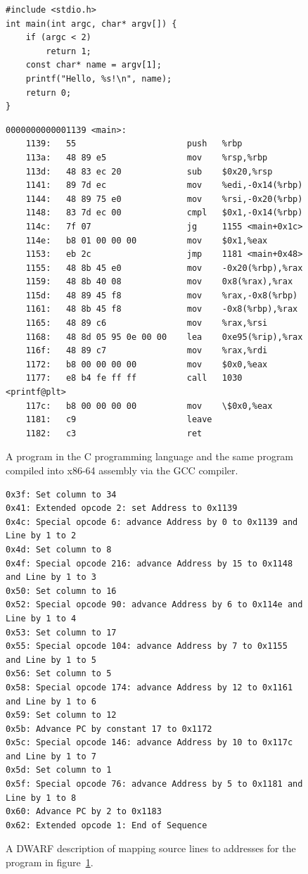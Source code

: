 \begin{figure}
    \begin{verbatim}
#include <stdio.h>
int main(int argc, char* argv[]) {
    if (argc < 2)
        return 1;
    const char* name = argv[1];
    printf("Hello, %s!\n", name);
    return 0;
}
    \end{verbatim}
    \begin{lstlisting}
0000000000001139 <main>:
    1139:	55                   	push   %rbp
    113a:	48 89 e5             	mov    %rsp,%rbp
    113d:	48 83 ec 20          	sub    $0x20,%rsp
    1141:	89 7d ec             	mov    %edi,-0x14(%rbp)
    1144:	48 89 75 e0          	mov    %rsi,-0x20(%rbp)
    1148:	83 7d ec 00          	cmpl   $0x1,-0x14(%rbp)
    114c:	7f 07                	jg     1155 <main+0x1c>
    114e:	b8 01 00 00 00       	mov    $0x1,%eax
    1153:	eb 2c                	jmp    1181 <main+0x48>
    1155:	48 8b 45 e0          	mov    -0x20(%rbp),%rax
    1159:	48 8b 40 08          	mov    0x8(%rax),%rax
    115d:	48 89 45 f8          	mov    %rax,-0x8(%rbp)
    1161:	48 8b 45 f8          	mov    -0x8(%rbp),%rax
    1165:	48 89 c6             	mov    %rax,%rsi
    1168:	48 8d 05 95 0e 00 00 	lea    0xe95(%rip),%rax
    116f:	48 89 c7             	mov    %rax,%rdi
    1172:	b8 00 00 00 00       	mov    $0x0,%eax
    1177:	e8 b4 fe ff ff       	call   1030 <printf@plt>
    117c:	b8 00 00 00 00       	mov    \$0x0,%eax
    1181:	c9                   	leave
    1182:	c3                   	ret
    \end{lstlisting}
    \caption{A program in the C programming language and the same program
    compiled into x86-64 assembly via the GCC compiler.}
    \label{fig:c-program-and-its-assembly}
\end{figure}

\begin{figure}
    \begin{lstlisting}
0x3f: Set column to 34
0x41: Extended opcode 2: set Address to 0x1139
0x4c: Special opcode 6: advance Address by 0 to 0x1139 and Line by 1 to 2
0x4d: Set column to 8
0x4f: Special opcode 216: advance Address by 15 to 0x1148 and Line by 1 to 3
0x50: Set column to 16
0x52: Special opcode 90: advance Address by 6 to 0x114e and Line by 1 to 4
0x53: Set column to 17
0x55: Special opcode 104: advance Address by 7 to 0x1155 and Line by 1 to 5
0x56: Set column to 5
0x58: Special opcode 174: advance Address by 12 to 0x1161 and Line by 1 to 6
0x59: Set column to 12
0x5b: Advance PC by constant 17 to 0x1172
0x5c: Special opcode 146: advance Address by 10 to 0x117c and Line by 1 to 7
0x5d: Set column to 1
0x5f: Special opcode 76: advance Address by 5 to 0x1181 and Line by 1 to 8
0x60: Advance PC by 2 to 0x1183
0x62: Extended opcode 1: End of Sequence
    \end{lstlisting}
    \caption{A DWARF description of mapping source lines to addresses for
    the program in figure~\ref{fig:c-program-and-its-assembly}.}
    \label{fig:dwarf-locations}
\end{figure}

